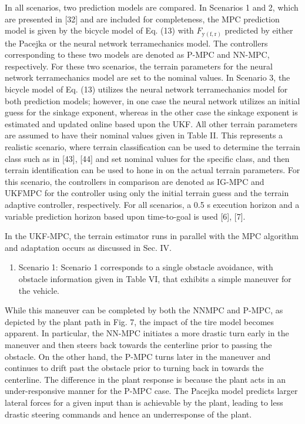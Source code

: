 \documentclass[10pt]{article}
\begin{document}
In all scenarios, two prediction models are compared. In Scenarios 1 and 2, which are presented in [32] and are included for completeness, the MPC prediction model is given by the bicycle model of Eq. (13) with $F_{\mathrm{y}(\mathrm{f}, \mathrm{r})}$ predicted by either the Pacejka or the neural network terramechanics model. The controllers corresponding to these two models are denoted as P-MPC and NN-MPC, respectively. For these two scenarios, the terrain parameters for the neural network terramechanics model are set to the nominal values. In Scenario 3, the bicycle model of Eq. (13) utilizes the neural network terramechanics model for both prediction models; however, in one case the neural network utilizes an initial guess for the sinkage exponent, whereas in the other case the sinkage exponent is estimated and updated online based upon the UKF. All other terrain parameters are assumed to have their nominal values given in Table II. This represents a realistic scenario, where terrain classification can be used to determine the terrain class such as in [43], [44] and set nominal values for the specific class, and then terrain identification can be used to hone in on the actual terrain parameters. For this scenario, the controllers in comparison are denoted as IG-MPC and UKFMPC for the controller using only the initial terrain guess and the terrain adaptive controller, respectively. For all scenarios, a 0.5 s execution horizon and a variable prediction horizon based upon time-to-goal is used [6], [7].

In the UKF-MPC, the terrain estimator runs in parallel with the MPC algorithm and adaptation occurs as discussed in Sec. IV.

\begin{enumerate}
  \item Scenario 1: Scenario 1 corresponds to a single obstacle avoidance, with obstacle information given in Table VI, that exhibits a simple maneuver for the vehicle.
\end{enumerate}

While this maneuver can be completed by both the NNMPC and P-MPC, as depicted by the plant path in Fig. 7, the impact of the tire model becomes apparent. In particular, the NN-MPC initiates a more drastic turn early in the maneuver and then steers back towards the centerline prior to passing the obstacle. On the other hand, the P-MPC turns later in the maneuver and continues to drift past the obstacle prior to turning back in towards the centerline. The difference in the plant response is because the plant acts in an under-responsive manner for the P-MPC case. The Pacejka model predicts larger lateral forces for a given input than is achievable by the plant, leading to less drastic steering commands and hence an underresponse of the plant.
\end{document}
